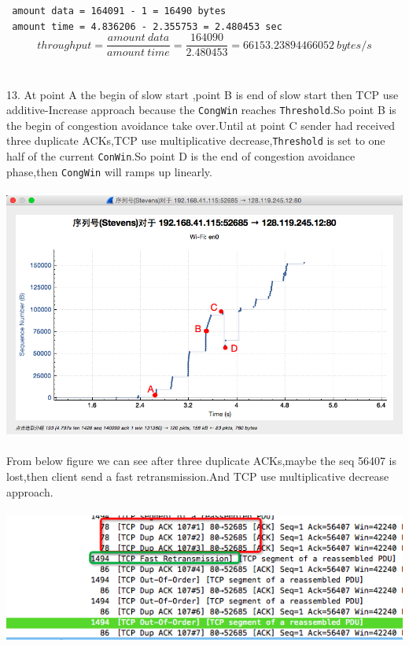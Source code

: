 \documentclass[a4paper]{article}
\begin{document}
{	\verb| amount data = 164091 - 1 = 16490 bytes|\\
	\verb| amount time = 4.836206 - 2.355753 = 2.480453 sec| \\
	\[ throughput = \frac{amount \ data}{amount \ time} = \frac{ 164090}{2.480453} = 66153.23894466052 \ bytes/s\] \\\\
	13. At point A the begin of slow start ,point B is end of slow start then TCP use additive-Increase approach because the \verb|CongWin| reaches \verb|Threshold|.So point B is the begin of congestion avoidance take over.Until at point C sender had received three duplicate ACKs,TCP use multiplicative decrease,\verb|Threshold| is set to one half of the current \verb|ConWin|.So point D is the end of congestion avoidance phase,then \verb|CongWin| will ramps up linearly.\\\\ 
	{\centering\includegraphics[scale=0.5]{Illustrations/13_2.png}}\\\\
	From below figure we can see after three duplicate ACKs,maybe the seq 56407 is lost,then client send a fast retransmission.And TCP use multiplicative decrease 
	approach.		\\\\
	{\centering\includegraphics[scale=0.5]{Illustrations/13_1.png}}\\\\
}
\end{document}
